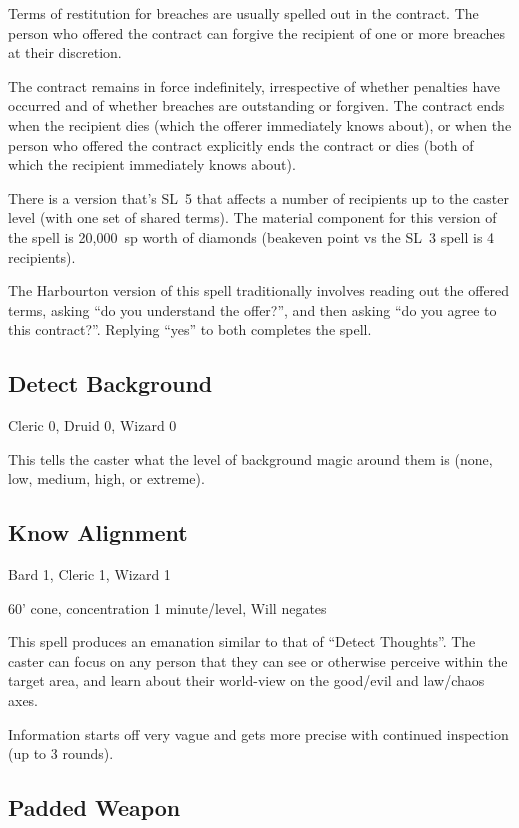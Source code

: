 Terms of restitution for breaches are usually spelled out in the contract.
The person who offered the contract can forgive the recipient of one or
more breaches at their discretion.

The contract remains in force indefinitely, irrespective of whether
penalties have occurred and of whether breaches are outstanding or forgiven.
The contract ends when the recipient dies (which the offerer immediately
knows about), or when the person who offered the contract explicitly ends
the contract or dies (both of which the recipient immediately knows about).

There is a version that's SL~5 that affects a number of recipients up to
the caster level (with one set of shared terms). The material component for
this version of the spell is \mbox{20,000~sp} worth of diamonds (beakeven
point vs the SL~3 spell is 4 recipients).

The Harbourton version of this spell traditionally involves reading out the
offered terms, asking ``do you understand the offer?'', and then asking
``do you agree to this contract?''. Replying ``yes'' to both completes the
spell.
%

%
\subsection{Detect Background}

Cleric 0, Druid 0, Wizard 0

This tells the caster what the level of background magic around them is
(none, low, medium, high, or extreme).
%

%
\subsection{Know Alignment}

Bard 1, Cleric 1, Wizard 1

60' cone, concentration 1 minute/level, Will negates

This spell produces an emanation similar to that of ``Detect Thoughts''.
The caster can focus on any person that they can see or otherwise perceive
within the target area, and learn about their world-view on the good/evil
and law/chaos axes.

Information starts off very vague and gets more precise with continued
inspection (up to 3 rounds).
%

%
\subsection{Padded Weapon}

